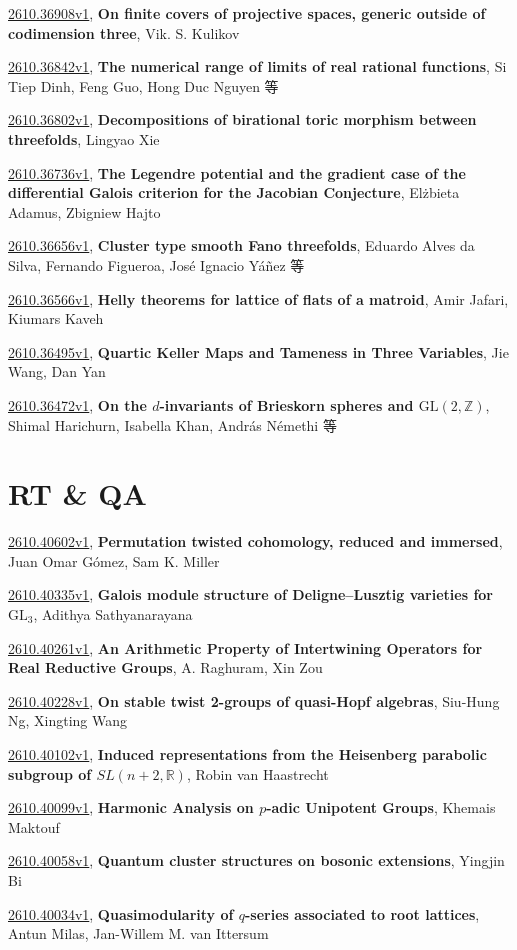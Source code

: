 \documentclass[9pt, a4paper]{article}
\theoremstyle{plain}
\theoremstyle{definition}
\theoremstyle{remark}
\newcommand{\arxiv}[3]{\href{https://arxiv.org/abs/#1}{#1}, \textbf{\textcolor{arxivblue}{#2}}, #3}
\begin{document}
\arxiv{2610.36908v1}{On finite covers of projective spaces, generic outside of codimension three}{Vik. S. Kulikov}

\arxiv{2610.36842v1}{The numerical range of limits of real rational functions}{Si Tiep Dinh, Feng Guo, Hong Duc Nguyen 等}

\arxiv{2610.36802v1}{Decompositions of birational toric morphism between threefolds}{Lingyao Xie}

\arxiv{2610.36736v1}{The Legendre potential and the gradient case of the differential Galois criterion for the Jacobian Conjecture}{Elżbieta Adamus, Zbigniew Hajto}

\arxiv{2610.36656v1}{Cluster type smooth Fano threefolds}{Eduardo Alves da Silva, Fernando Figueroa, José Ignacio Yáñez 等}

\arxiv{2610.36566v1}{Helly theorems for lattice of flats of a matroid}{Amir Jafari, Kiumars Kaveh}

\arxiv{2610.36495v1}{Quartic Keller Maps and Tameness in Three Variables}{Jie Wang, Dan Yan}

\arxiv{2610.36472v1}{On the $d$-invariants of Brieskorn spheres and $\mathrm{GL}(2,\mathbb{Z})$}{Shimal Harichurn, Isabella Khan, András Némethi 等}


\section{RT \& QA}
\arxiv{2610.40602v1}{Permutation twisted cohomology, reduced and immersed}{Juan Omar Gómez, Sam K. Miller}

\arxiv{2610.40335v1}{Galois module structure of Deligne--Lusztig varieties for $\mathrm{GL}_3$}{Adithya Sathyanarayana}

\arxiv{2610.40261v1}{An Arithmetic Property of Intertwining Operators for Real Reductive Groups}{A. Raghuram, Xin Zou}

\arxiv{2610.40228v1}{On stable twist 2-groups of quasi-Hopf algebras}{Siu-Hung Ng, Xingting Wang}

\arxiv{2610.40102v1}{Induced representations from the Heisenberg parabolic subgroup of $SL(n+2,\mathbb{R})$}{Robin van Haastrecht}

\arxiv{2610.40099v1}{Harmonic Analysis on $p$-adic Unipotent Groups}{Khemais Maktouf}

\arxiv{2610.40058v1}{Quantum cluster structures on bosonic extensions}{Yingjin Bi}

\arxiv{2610.40034v1}{Quasimodularity of $q$-series associated to root lattices}{Antun Milas, Jan-Willem M. van Ittersum}
\end{document}
